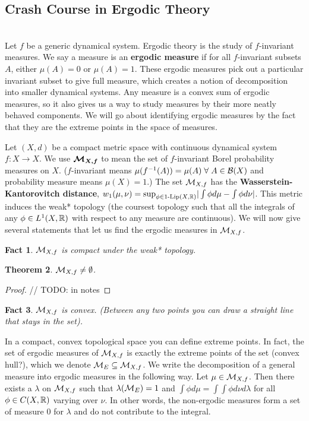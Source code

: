 \documentclass[11pt, reqno]{amsart}
\theoremstyle{plain}
\newtheorem{thm}{Theorem}[section]
\numberwithin{thm}{subsection}
\newtheorem{fact}[thm]{Fact}
\theoremstyle{definition}
\begin{document}

\subsection{Crash Course in Ergodic Theory}\cite[L10]{wolf} \\
Let $f$ be a generic dynamical system. Ergodic theory is the study of $f$-invariant measures. We say a measure is an \textbf{ergodic measure} if for all $f$-invariant subsets $A$, either $\mu(A) = 0$ or $\mu(A) = 1$. These ergodic measures pick out a particular invariant subset to give full measure, which creates a notion of decomposition into smaller dynamical systems. Any measure is a convex sum of ergodic measures, so it also gives us a way to study measures by their more neatly behaved components. We will go about identifying ergodic measures by the fact that they are the extreme points in the space of measures. 

Let $(X, d)$ be a compact metric space with continuous dynamical system $f: X \rightarrow X$. We use $\boldsymbol{\mathcal{M}_{X,f}}$ to mean the set of $f$-invariant Borel probability measures on $X$. ($f$-invariant means $\mu(f^{-1}(A)) = \mu(A) \;\forall\; A \in \mathcal{B}(X)$ and probability measure means $\mu(X) = 1$.) The set $\mathcal{M}_{X,f}$ has the \textbf{Wasserstein-Kantorovitch distance}, $w_1(\mu, \nu) = \text{sup}_{\phi \in 1\text{-Lip}(X,\mathbb{R})}|\int \phi d\mu - \int \phi d\nu|$. This metric induces the weak* topology (the coursest topology such that all the integrals of any $\phi \in L^1(X, \mathbb{R})$ with respect to any measure are continuous). We will now give several statements that let us find the ergodic measures in $\mathcal{M}_{X,f}$.

\begin{fact}
  $\mathcal{M}_{X,f}$ is compact under the weak* topology.
\end{fact}

\begin{thm}
  $\mathcal{M}_{X,f} \neq \emptyset$. 
\end{thm}

\begin{proof}
  // TODO: in notes
\end{proof}

\begin{fact}
  $\mathcal{M}_{X,f}$ is convex. (Between any two points you can draw a straight line that stays in the set).
\end{fact}

In a compact, convex topological space you can define extreme points. In fact, the set of ergodic measures of $\mathcal{M}_{X,f}$ is exactly the extreme points of the set (convex hull?), which we denote $\mathcal{M}_E \subseteq \mathcal{M}_{X,f}$. We write the decomposition of a general measure into ergodic measures in the following way. Let $\mu \in \mathcal{M}_{X,f}$. Then there exists a $\lambda$ on $\mathcal{M}_{X,f}$ such that $\lambda(\mathcal{M}_E) = 1$ and $\int \phi d\mu = \int \int \phi d\nu d\lambda$ for all $\phi \in C(X, \mathbb{R})$ varying over $\nu$. In other words, the non-ergodic measures form a set of measure 0 for $\lambda$ and do not contribute to the integral.
\end{document}
